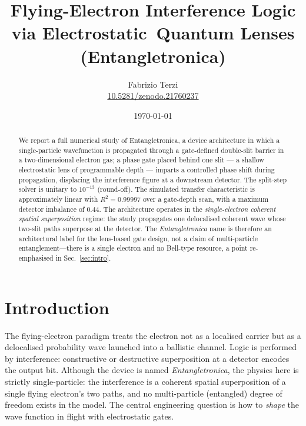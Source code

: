 \documentclass[11pt,a4paper]{article}
\newcommand{\ent}{Entangletronica}
\begin{document}
\title{Flying-Electron Interference Logic via Electrostatic\
Quantum Lenses (Entangletronica)}
\author{Fabrizio Terzi\\
\small{\href{https://doi.org/10.5281/zenodo.21760237}{10.5281/zenodo.21760237}}}
\date{\today}
\maketitle

\begin{abstract}
We report a full numerical study of \ent, a device architecture in which
a single-particle wavefunction is propagated through a gate-defined double-slit
barrier in a two-dimensional electron gas; a phase gate placed
behind one slit --- a shallow electrostatic lens of programmable depth ---
imparts a controlled phase shift during propagation, displacing the interference
figure at a downstream detector. The split-step solver is unitary to
$10^{-13}$ (round-off). The simulated transfer characteristic is approximately
linear with $R^2 = 0.99997$ over a gate-depth scan, with a maximum detector
imbalance of $0.44$. The architecture operates in the
\emph{single-electron coherent spatial superposition} regime: the study
propagates one delocalised coherent wave whose two-slit paths superpose at
the detector. The \emph{Entangletronica} name is therefore an architectural
label for the lens-based gate design, not a claim of multi-particle
entanglement---there is a single electron and no Bell-type resource, a point
re-emphasised in Sec.~\ref{sec:intro}.
\end{abstract}

\section{Introduction}
\label{sec:intro}

The flying-electron paradigm \cite{bertoni, ji, bliokh} treats the electron not as a
localised carrier but as a delocalised probability wave launched into a
ballistic channel. Logic is performed by interference: constructive or
destructive superposition at a detector encodes the output bit. Although the
device is named \emph{Entangletronica}, the physics here is strictly
single-particle: the interference is a coherent spatial superposition of a
single flying electron's two paths, and no multi-particle (entangled) degree
of freedom exists in the model. The central
engineering question is how to \emph{shape} the wave function in flight with
electrostatic gates.
\end{document}
